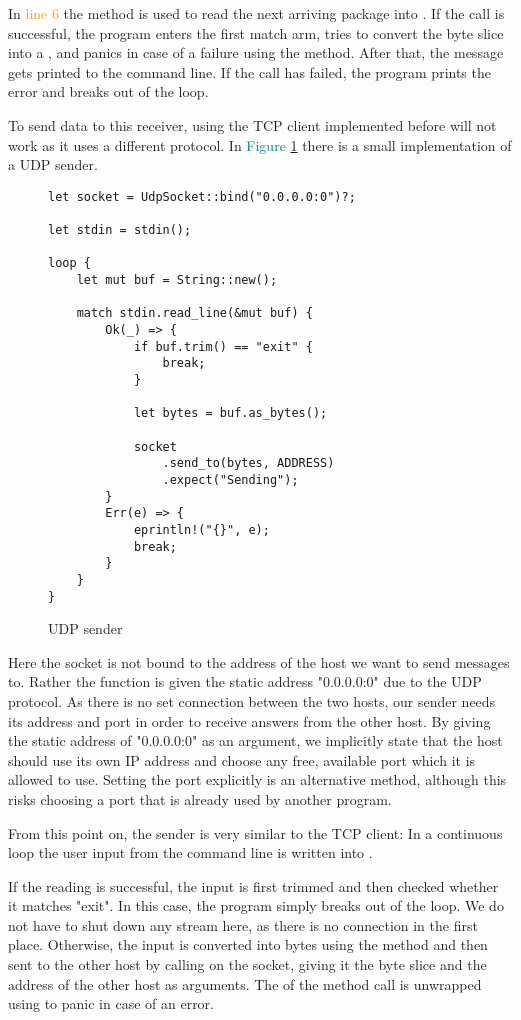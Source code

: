 In \textcolor{orange}{line 6} the method  is used to read the next arriving package into . If
the call is successful, the program enters the first match arm, tries to convert the byte slice into a , and
panics in case of a failure using the  method. After that, the message gets printed to the command line.
If the call has failed, the program prints the error and breaks out of the loop.

To send data to this receiver, using the TCP client implemented before will not work as it uses a different protocol. In
\textcolor{teal}{Figure \ref{udp-sender}} there is a small implementation of a UDP sender.

\begin{figure}[ht]
    \begin{verbatim}
let socket = UdpSocket::bind("0.0.0.0:0")?;

let stdin = stdin();

loop {
    let mut buf = String::new();

    match stdin.read_line(&mut buf) {
        Ok(_) => {
            if buf.trim() == "exit" {
                break;
            }

            let bytes = buf.as_bytes();

            socket
                .send_to(bytes, ADDRESS)
                .expect("Sending");
        }
        Err(e) => {
            eprintln!("{}", e);
            break;
        }
    }
}
    \end{verbatim}
    \caption{UDP sender}
    \label{udp-sender}
\end{figure}

Here the socket is not bound to the address of the host we want to send messages to. Rather the  function is
given the static address "0.0.0.0:0" due to the UDP protocol. As there is no set connection between the two hosts, our
sender needs its address and port in order to receive answers from the other host. By giving  the static
address of "0.0.0.0:0" as an argument, we implicitly state that the host should use its own IP address and choose any
free, available port which it is allowed to use. Setting the port explicitly is an alternative method, although this
risks choosing a port that is already used by another program.

From this point on, the sender is very similar to the TCP client: In a continuous loop the user input from the command
line is written into .

If the reading is successful, the input is first trimmed and then checked whether it matches "exit". In this case, the
program simply breaks out of the loop. We do not have to shut down any stream here, as there is no connection in the
first place. Otherwise, the input is converted into bytes using the method  and then sent to the other
host by calling  on the socket, giving it the byte slice and the address of the other host as arguments.
The  of the method call is unwrapped using  to panic in case of an error.
